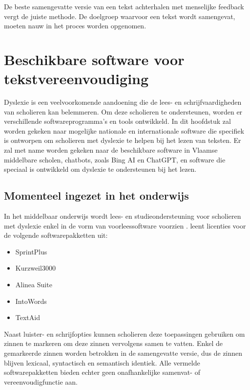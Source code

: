 De beste samengevatte versie van een tekst achterhalen met menselijke feedback vergt de juiste methode. De doelgroep waarvoor een tekst wordt samengevat, moeten nauw in het proces worden opgenomen.



\section{Beschikbare software voor tekstvereenvoudiging}

Dyslexie is een veelvoorkomende aandoening die de lees- en schrijfvaardigheden van scholieren kan belemmeren. Om deze scholieren te ondersteunen, worden er verschillende softwareprogramma's en tools ontwikkeld. In dit hoofdstuk zal worden gekeken naar mogelijke nationale en internationale software die specifiek is ontworpen om scholieren met dyslexie te helpen bij het lezen van teksten. Er zal met name worden gekeken naar de beschikbare software in Vlaamse middelbare scholen, chatbots, zoals Bing AI en ChatGPT, en software die speciaal is ontwikkeld om dyslexie te ondersteunen bij het lezen.

\subsection{Momenteel ingezet in het onderwijs}

In het middelbaar onderwijs wordt lees- en studieondersteuning voor scholieren met dyslexie enkel in de vorm van voorleessoftware voorzien \autocite{DeCraemer2018, OnderwijsVlaanderen2023}. \textcite{OnderwijsVlaanderen2023} leent licenties voor de volgende softwarepakketten uit:

\begin{itemize}
	\item SprintPlus
	\item Kurzweil3000
	\item Alinea Suite
	\item IntoWords
	\item TextAid
\end{itemize}

Naast luister- en schrijfopties kunnen scholieren deze toepassingen gebruiken om zinnen te markeren om deze zinnen vervolgens samen te vatten. Enkel de gemarkeerde zinnen worden betrokken in de samengevatte versie, dus de zinnen blijven lexicaal, syntactisch en semantisch identiek. Alle vermelde softwarepakketten bieden echter geen onafhankelijke samenvat- of vereenvoudigfunctie aan.

